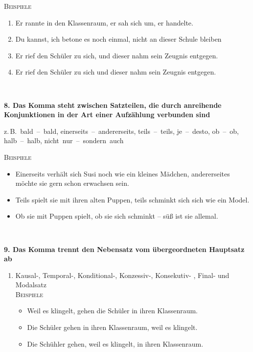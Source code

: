 \documentclass[landscape]{article}
\newcommand{\tbreak}{\\\vspace{-3mm}}
\newcommand{\zB}{z.\,B.}
\begin{document}
\begin{multicols*}{3}
    \textsc{Beispiele}\\

    \begin{enumerate}[label=(\arabic*)]
        \item Er rannte in den Klassenraum, er sah sich um, er handelte.
        \item Du kannst, ich betone es noch einmal, nicht an dieser Schule bleiben
        \item Er rief den Schüler zu sich, und dieser nahm sein Zeugnis entgegen.
        \item Er rief den Schüler zu sich und dieser nahm sein Zeugnis entgegen.
    \end{enumerate}\quad\tbreak

    \textbf{8. Das Komma steht zwischen Satzteilen, die durch anreihende Konjunktionen in der Art einer Aufzählung verbunden sind}\tbreak

    \zB\, \mbox{bald -- bald}, \mbox{einerseits -- andererseits}, \mbox{teils -- teils}, \mbox{je -- desto}, \mbox{ob -- ob}, \mbox{halb -- halb}, \mbox{nicht nur -- sondern auch}\tbreak

    \textsc{Beispiele}\\
   
    \begin{itemize}
        \item Einerseits verhält sich Susi noch wie ein kleines Mädchen, andererseites möchte sie gern schon erwachsen sein.     
        \item Teils spielt sie mit ihren alten Puppen, teils schminkt sich sich wie ein Model.
        \item Ob sie mit Puppen spielt, ob sie sich schminkt -- süß ist sie allemal.
    \end{itemize}\quad\tbreak

    \textbf{9. Das Komma trennt den Nebensatz vom übergeordneten Hauptsatz ab}\\
    \begin{enumerate}[label=(\alph*)]
        \item Kausal-, Temporal-, Konditional-, Konzessiv-, Konsekutiv- , Final- und Modalsatz\\
            \textsc{Beispiele}\\

            \begin{itemize}
                \item Weil es klingelt, gehen die Schüler in ihren Klassenraum.
                \item Die Schüler gehen in ihren Klassenraum, weil es klingelt.
                \item Die Schühler gehen, weil es klingelt, in ihren Klassenraum.
            \end{itemize}\quad\vspace{-4mm}


\end{enumerate}
\end{multicols*}
\end{document}
